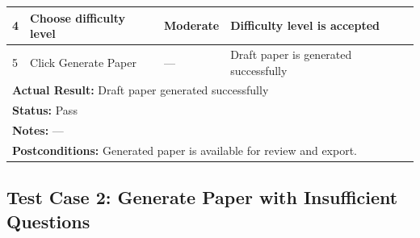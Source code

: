 \documentclass[12pt]{article}
\begin{document}
\begin{table}[H]
{\begin{tabular}{|p{3.3cm}|p{5.1cm}|p{3.3cm}|p{5.1cm}|}
4 & Choose difficulty level & Moderate &
Difficulty level is accepted \\ \hline

5 & Click Generate Paper & --- &
Draft paper is generated successfully \\ \hline

\multicolumn{4}{|l|}{\textbf{Actual Result:} Draft paper generated successfully} \\ \hline
\multicolumn{4}{|l|}{\textbf{Status:} Pass} \\ \hline
\multicolumn{4}{|l|}{\textbf{Notes:} ---} \\ \hline

\multicolumn{4}{|l|}{\textbf{Postconditions:}
Generated paper is available for review and export.} \\ \hline

\end{tabular}
}
\end{table}

\subsection{Test Case 2: Generate Paper with Insufficient Questions}
\end{document}
